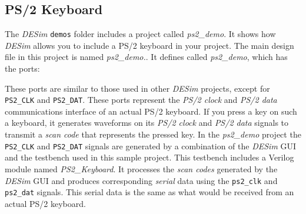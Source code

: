 {\subsection{PS/2 Keyboard}

The {\it DESim} \texttt{demos} folder includes a project called {\it ps2\_demo}. It shows how 
{\it DESim} allows you to include a PS/2 keyboard in your project.  The main design file in 
this project is named 
{\it ps2\_demo.\hdlFileExt }. It defines \fi
called {\it ps2\_demo}, which has the ports:

\vspace{-0.5cm}
\begin{center}
\begin{minipage}[h]{15 cm}
\ifverilog
    \ifnotSV
        
    \else
        
    \fi
\else
	
\fi
\end{minipage}
\end{center}

\vspace{-0.5cm}
These ports are similar to those used in other {\it DESim} projects, except for 
\texttt{PS2\_CLK} and \texttt{PS2\_DAT}. These ports represent the {\it PS/2 clock} and 
{\it PS/2 data} communications interface of an actual PS/2 keyboard. If you press a key on
such a keyboard, it generates waveforms on its {\it PS/2 clock} and {\it PS/2 data} signals to 
transmit a {\it scan code} that represents the pressed key. In the {\it ps2\_demo} project 
the \texttt{PS2\_CLK} and \texttt{PS2\_DAT} signals are generated by a combination of the
{\it DESim} GUI and the testbench used in this sample project. This testbench
includes a Verilog module named {\it PS2\_Keyboard}. It processes the {\it scan codes}
generated by the {\it DESim} GUI and produces corresponding {\it serial} data using the
\texttt{ps2\_clk} and \texttt{ps2\_dat} signals. This serial data is the same as what
would be received from an actual PS/2 keyboard.

}
